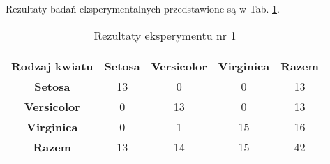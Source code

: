 \documentclass[12pt]{article}
\begin{document}
Rezultaty badań eksperymentalnych przedstawione są w Tab. \ref{wyniki1}.
\begin{table}[ht!]
 \caption{Rezultaty eksperymentu nr 1}
 \centering
 \vspace{0.2cm}
 \begin{tabular}{|c|c|c|c|c|}
  \hline\\[-0.5cm]
  \textbf{Rodzaj kwiatu} & \textbf{Setosa} & \textbf{Versicolor} & \textbf{Virginica} & \textbf{Razem}\\[0.1cm]
  \hline
  \textbf{Setosa} & 13 & 0 & 0 & 13  \\ \hline
  \textbf{Versicolor} & 0 & 13 & 0 & 13  \\ \hline
  \textbf{Virginica} & 0 &  1 & 15 & 16  \\ \hline
  \textbf{Razem} & 13 & 14 & 15 & 42 \\ [0.1cm]
  \hline
 \end{tabular}
 \label{wyniki1}
\end{table}
\end{document}
